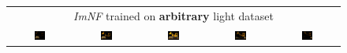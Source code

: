 \begin{figure}[!htb]
\begin{tabular*}{\textwidth}{ c c c c c }
        \multicolumn{5}{c}{\textit{ImNF} trained on \textbf{arbitrary} light dataset} \\
          \includegraphics[width=0.19\textwidth]{figures/results/arb_set/dynamic_light/imnf_rand_vc0_ld-90.png}
        & \includegraphics[width=0.19\textwidth]{figures/results/arb_set/dynamic_light/imnf_rand_vc0_ld-60.png}
        & \includegraphics[width=0.19\textwidth]{figures/results/arb_set/dynamic_light/imnf_rand_vc0_ld0.png}
        & \includegraphics[width=0.19\textwidth]{figures/results/arb_set/dynamic_light/imnf_rand_vc0_ld60.png} 
        & \includegraphics[width=0.19\textwidth]{figures/results/arb_set/dynamic_light/imnf_rand_vc0_ld90.png} \\
        

\end{tabular*}
\end{figure}
